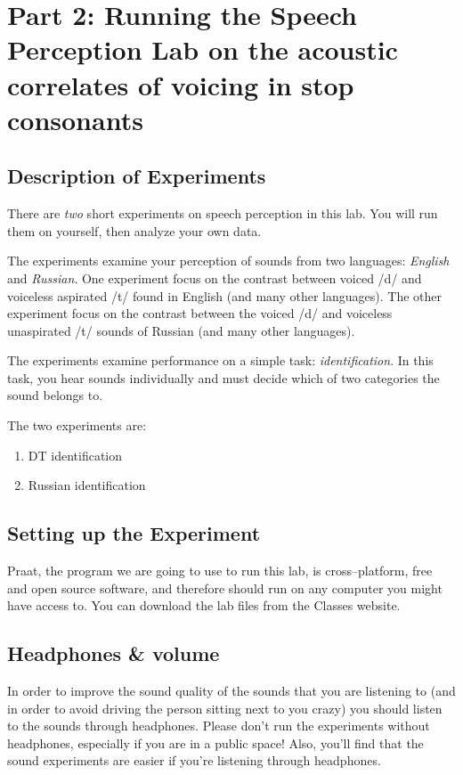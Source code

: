 \documentclass{article}
\newcommand{\soft}[1]{\textsf{#1}}
\newcommand{\Praat}{\soft{Praat}}
\begin{document}
%
%
 	
\section{Part 2: Running the Speech Perception Lab on the acoustic correlates of voicing in stop consonants}

\subsection{Description of Experiments}

There are \emph{two} short experiments on speech perception in this lab. You will run them on yourself, then analyze your own data.

The experiments examine your perception of sounds from two languages: \emph{English} and \emph{Russian}. One experiment focus on the contrast between voiced /d/ and voiceless aspirated /t/ found in English (and many other languages). The other experiment focus on the contrast between the voiced /d/ and voiceless unaspirated /t/ sounds of Russian (and many other languages).

The experiments examine performance on a simple task: \emph{identification}. In this task, you hear sounds individually and must decide which of two categories the sound belongs to.

The two experiments are:

\begin{enumerate}
\item DT identification
\item Russian identification
\end{enumerate}

\subsection{Setting up the Experiment}

\Praat{}, the program we are going to use to run this lab, is cross--platform, free and open source software, and therefore should run on any computer you might have access to. You can download the lab files from the Classes website.

\subsection{Headphones \& volume}

In order to improve the sound quality of the sounds that you are listening to (and in order to avoid driving the person sitting next to you crazy) you should listen to the sounds through headphones. Please don't run the experiments without headphones, especially if you are in a public space! Also, you'll find that the sound experiments are easier if you're listening through headphones.
\end{document}
